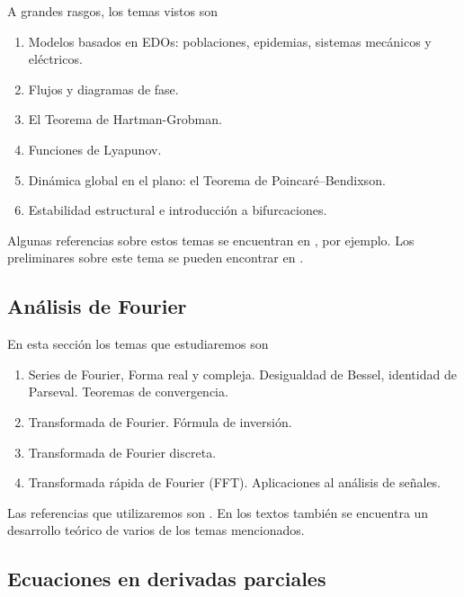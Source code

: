 \documentclass[12pt, a4paper]{amsbook}
\theoremstyle{remark}
\theoremstyle{definition}
\numberwithin{section}{chapter}
\numberwithin{subsection}{section}
\numberwithin{equation}{section}
\numberwithin{figure}{chapter}
\begin{document}
A grandes rasgos, los temas vistos son
\begin{enumerate}

\item Modelos basados en EDOs: poblaciones, epidemias, sistemas mecánicos y eléctricos.

\item Flujos y diagramas de fase.

\item El Teorema de Hartman-Grobman.

\item Funciones de Lyapunov.

\item Dinámica global en el plano: el Teorema de Poincaré--Bendixson.

\item Estabilidad estructural e introducción a bifurcaciones.
\end{enumerate}

Algunas referencias sobre estos temas se encuentran en \cite{Boccara, Lynch, Mindlin, Strogatz}, por ejemplo. Los preliminares sobre este tema se pueden encontrar en \cite{Wolanski}.

\subsection*{Análisis de Fourier}

En esta sección los temas que estudiaremos son
\begin{enumerate}
\item Series de Fourier, Forma real y compleja. Desigualdad de Bessel, identidad de Parseval. Teoremas de convergencia.

\item Transformada de Fourier. Fórmula de inversión.

\item Transformada de Fourier discreta.

\item Transformada rápida de Fourier (FFT). Aplicaciones al análisis de señales.
\end{enumerate}

Las referencias que utilizaremos son \cite{Duoandikoetxea, James, Proakis}. En los textos \cite{Evans, Salsa, Strauss} también se encuentra un desarrollo teórico de varios de los temas mencionados.

\subsection*{Ecuaciones en derivadas parciales}
\end{document}
